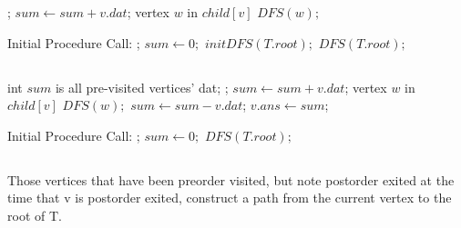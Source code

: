 \Prog\qq
{}; \p
$sum \leftarrow sum + v.dat$;\p
\Foreach vertex $w$ in $child[v]$ \Do\p
$DFS(w);$\p
\Endfor\qq
\Fini 

Initial Procedure Call:
\Prog\qq
{};\p
$sum \leftarrow 0;$\p
$initDFS(T.root);$\qq
$DFS(T.root);$\qq
\Fini




\subsection{}
\Prog\qq
\Global int $sum$ is all pre-visited vertices' dat;\qq
{}; \p
$sum \leftarrow sum + v.dat$;\p
\Foreach vertex $w$ in $child[v]$ \Do\p
$DFS(w);$\p
\Endfor\p
$sum \leftarrow sum - v.dat$;\p
$v.ans \leftarrow sum$;\qq
\Fini 

Initial Procedure Call:
\Prog\qq
{};\p
$sum \leftarrow 0;$\p
$DFS(T.root);$\qq
\Fini




\subsection{}
Those vertices that have been preorder visited, but note postorder exited at the time that v is postorder exited, construct a path from the current vertex to the root of T.



